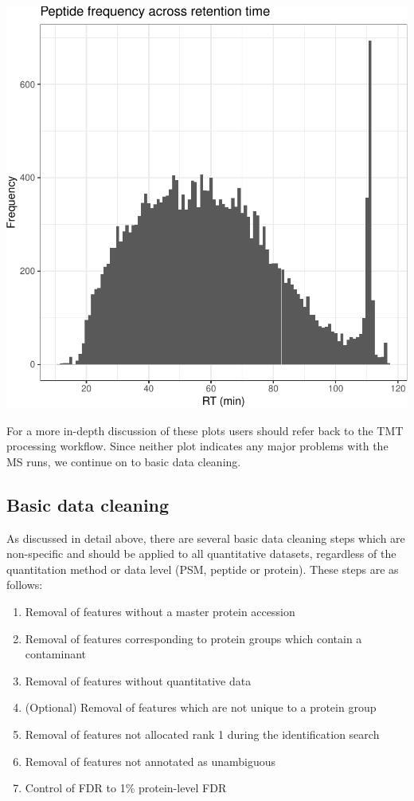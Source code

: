 \documentclass[9pt,a4paper,]{extarticle}
\begin{document}
\begin{center}\includegraphics[height=0.3\textheight]{workflow_expressions_files/figure-latex/lfq_RT-1} \end{center}

For a more in-depth discussion of these plots users should refer back to the TMT
processing workflow. Since neither plot indicates any major problems with the MS
runs, we continue on to basic data cleaning.

\subsection{Basic data cleaning}\label{basic-data-cleaning-1}

As discussed in detail above, there are several basic data cleaning steps which
are non-specific and should be applied to all quantitative datasets, regardless
of the quantitation method or data level (PSM, peptide or protein). These steps
are as follows:

\begin{enumerate}
\def\labelenumi{\arabic{enumi}.}
\item
  Removal of features without a master protein accession
\item
  Removal of features corresponding to protein groups which contain a
  contaminant
\item
  Removal of features without quantitative data
\item
  (Optional) Removal of features which are not unique to a protein group
\item
  Removal of features not allocated rank 1 during the identification search
\item
  Removal of features not annotated as unambiguous
\item
  Control of FDR to 1\% protein-level FDR
\end{enumerate}
\end{document}
